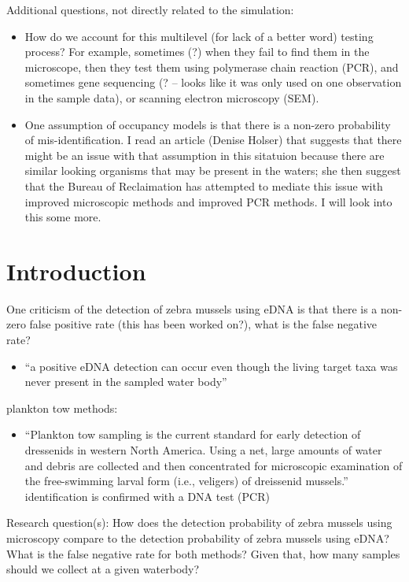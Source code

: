 \documentclass[12pt]{article}\usepackage[]{graphicx}\usepackage[]{color}
\begin{document}
Additional questions, not directly related to the simulation:
\begin{itemize}
	\item How do we account for this multilevel (for lack of a better word) testing process? For example, sometimes (?) when they fail to find them in the microscope, then they test them using polymerase chain reaction (PCR), and sometimes gene sequencing (? -- looks like it was only used on one observation in the sample data), or scanning electron microscopy (SEM).
	\item One assumption of occupancy models is that there is a non-zero probability of mis-identification. I read an article (Denise Holser) that suggests that there might be an issue with that assumption in this sitatuion because there are similar looking organisms that may be present in the waters; she then suggest that the Bureau of Reclaimation has attempted to mediate this issue with improved microscopic methods and improved PCR methods. I will look into this some more.   
\end{itemize}


\section{Introduction}



One criticism of the detection of zebra mussels using eDNA is that there is a non-zero false positive rate (this has been worked on?), what is the false negative rate?
\begin{itemize}
\item ``a positive eDNA detection can occur even though the living target taxa was never present in the sampled water body'' \cite{Sepulveda:eDNA}
\end{itemize}

plankton tow methods: 
\begin{itemize}
\item ``Plankton tow sampling is the current standard for early detection of dressenids in western North America. Using a net, large amounts of water and debris are collected and then concentrated for microscopic examination of the free-swimming larval form (i.e., veligers) of dreissenid mussels.'' identification is confirmed with a DNA test (PCR) \cite{Sepulvelda:eDNA} 
\end{itemize}

Research question(s): How does the detection probability of zebra mussels using microscopy compare to the detection probability of zebra mussels using eDNA? What is the false negative rate for both methods? Given that, how many samples should we collect at a given waterbody? 
\end{document}
